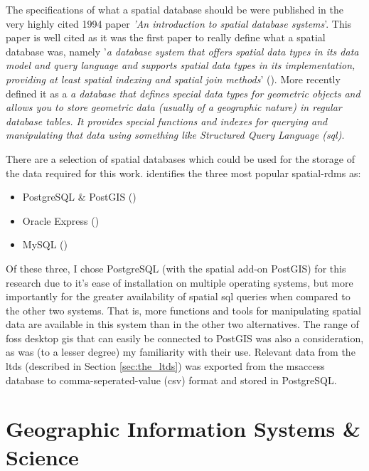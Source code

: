 The specifications of what a spatial database should be were published in the very highly cited 1994 paper \textit{'An introduction to spatial database systems}'. This paper is well cited as it was the first paper to really define what a spatial database was, namely '\textit{a database system that offers spatial data types in its data model and query language and supports spatial data types in its implementation, providing at least spatial indexing and spatial join methods}' (\cite{Guting1994}). More recently \cite{ObeHsu201410} defined it as a \textit{a database that defines special data types for geometric objects and allows you to store geometric data (usually of a geographic nature) in regular database tables. It provides special functions and indexes for querying and manipulating that data using something like Structured Query Language (\gls{sql})}.

There are a selection of spatial databases which could be used for the storage of the data required for this work. \cite{Ellul2012} identifies the three most popular spatial-\gls{rdms} as:

\begin{itemize}
\item PostgreSQL \& PostGIS (\cite{PostgreSQL2014})
\item Oracle Express (\cite{Oracle2014})
\item MySQL (\cite{MySQL2014})
\end{itemize}

Of these three, I chose PostgreSQL (with the spatial add-on PostGIS) for this research due to it's ease of installation on multiple operating systems, but more importantly for the greater availability of spatial \gls{sql} queries when compared to the other two systems. That is, more functions and tools for manipulating spatial data are available in this system than in the other two alternatives. The range of \gls{foss} desktop \gls{gis} that can easily be connected to PostGIS was also a consideration, as was (to a lesser degree) my familiarity with their use. Relevant data from the \gls{ltds} (described in Section \ref{sec:the_ltds}) was exported from the \gls{msaccess} database to comma-seperated-value (\gls{csv}) format and stored in PostgreSQL.


\section{Geographic Information Systems \& Science}
\label{sec:gis}

